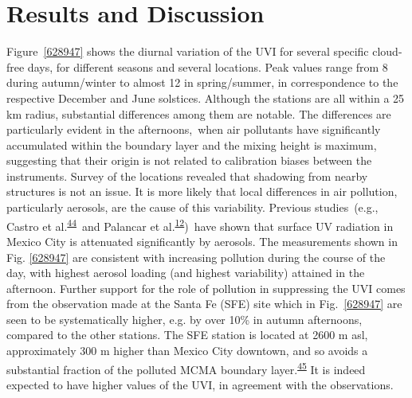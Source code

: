 \documentclass[10pt]{article}
\begin{document}
\section*{Results and Discussion}

{\label{447962}}

Figure~{\ref{628947}} shows the diurnal variation of
the UVI for several specific cloud-free days, for different seasons and
several locations. Peak values range from 8 during autumn/winter to
almost 12 in spring/summer, in correspondence to the respective December
and June solstices. Although the stations are all within a 25 km radius,
substantial differences among them are notable. The differences are
particularly evident in the afternoons,~when air pollutants have
significantly accumulated within the boundary layer and the mixing
height is maximum, suggesting that their origin is not related to
calibration biases between the instruments. Survey of the locations
revealed that shadowing from nearby structures is not an issue. It is
more likely that local differences in air pollution, particularly
aerosols, are the cause of this variability. Previous studies~(e.g.,
Castro et al.\textsuperscript{\hyperref[csl:44]{44}}~and Palancar et
al.\textsuperscript{\hyperref[csl:12]{12}})~have shown that surface UV radiation in Mexico
City is attenuated significantly by aerosols. The measurements shown in
Fig. {\ref{628947}} are consistent with increasing
pollution during the course of the day, with highest aerosol loading
(and highest variability) attained in the afternoon. Further support for
the role of pollution in suppressing the UVI comes from the observation
made at the Santa Fe (SFE) site which in
Fig.~{\ref{628947}} are seen to be systematically
higher, e.g. by over 10\% in autumn afternoons, compared to the other
stations. The SFE station is located at 2600 m asl, approximately 300 m
higher than Mexico City downtown, and so avoids a substantial fraction
of the polluted MCMA boundary layer.\textsuperscript{\hyperref[csl:45]{45}} It is indeed
expected to have higher values of the UVI, in agreement with the
observations.
\end{document}

